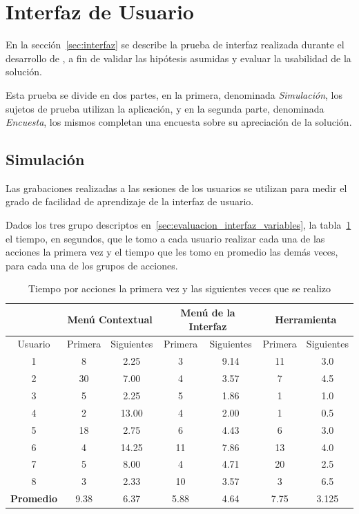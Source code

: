 \section{Interfaz de Usuario}
\label{sec:res_INTERFAZ}

En la sección~\ref{sec:interfaz} se describe la prueba de interfaz realizada
durante el desarrollo de , a fin de validar las
hipótesis asumidas y evaluar la usabilidad de la solución.

Esta prueba se divide en dos partes, en la primera, denominada
\emph{Simulación}, los sujetos de prueba utilizan la aplicación, y en la
segunda parte, denominada \emph{Encuesta}, los mismos completan una encuesta
sobre su apreciación de la solución.

\subsection{Simulación}

Las grabaciones realizadas a las sesiones de los usuarios se utilizan para medir
el grado de facilidad de aprendizaje de la interfaz de usuario.

Dados los tres grupo descriptos en~\ref{sec:evaluacion_interfaz_variables}, la
tabla~\ref{tab:interfaz_tiempo_acciones}  el tiempo, en segundos,
que le tomo a cada usuario realizar cada una de las acciones la primera vez y
el tiempo que les tomo en promedio las demás veces, para cada una de los grupos
de acciones.


\begin{table}[!hbt]
\centering
\begin{tabular}{|c|c|c|c|c|c|c|}
\hline
\rowcolor{gris} \textbf{} & \multicolumn{2}{|c|}{\textbf{Menú Contextual}} &
\multicolumn{2}{|c|}{\textbf{Menú de la Interfaz}} &
\multicolumn{2}{|c|}{\textbf{Herramienta}}\\
\hline
\rowcolor{gris} Usuario & Primera & Siguientes & Primera & Siguientes & Primera & Siguientes \\
\hline 1 &  8 &  2.25 &  3 & 9.14 & 11 & 3.0 \\
\hline 2 & 30 &  7.00 &  4 & 3.57 &  7 & 4.5 \\
\hline 3 &  5 &  2.25 &  5 & 1.86 &  1 & 1.0 \\
\hline 4 &  2 & 13.00 &  4 & 2.00 &  1 & 0.5 \\
\hline 5 & 18 &  2.75 &  6 & 4.43 &  6 & 3.0 \\
\hline 6 &  4 & 14.25 & 11 & 7.86 & 13 & 4.0 \\
\hline 7 &  5 &  8.00 &  4 & 4.71 & 20 & 2.5 \\
\hline 8 &  3 &  2.33 & 10 & 3.57 &  3 & 6.5 \\
\hline
\textbf{Promedio} & 9.38 & 6.37 & 5.88 & 4.64 & 7.75 & 3.125 \\
\end{tabular}
\caption{Tiempo por acciones la primera vez y las siguientes veces que se realizo}
\label{tab:interfaz_tiempo_acciones}
\end{table}

